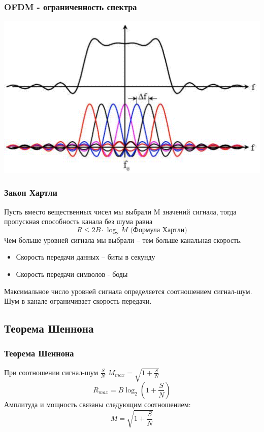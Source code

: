 \documentclass[utf8]{beamer}
\begin{document}
\begin{frame}
\frametitle{OFDM - ограниченность спектра}
\begin{center}
\includegraphics[width=\textwidth]{pic/ofdm-spectrum.pdf}
\end{center}
\end{frame}
\begin{frame}
\frametitle{Закон Хартли}
Пусть вместо вещественных чисел мы выбрали M значений сигнала, тогда пропускная способность канала без шума равна
$$
R\leq 2B\cdot \log_2 M \textrm{ (Формула Хартли)}
$$
Чем больше уровней сигнала мы выбрали -- тем больше канальная скорость.
\begin{itemize}
	\item Скорость передачи данных -- биты в секунду
	\item Скорость передачи символов - боды
\end{itemize}
Максимальное число уровней сигнала определяется соотношением сигнал-шум. Шум в канале ограничивает скорость передачи.
\end{frame}
\subsection{Теорема Шеннона}
\begin{frame}
\frametitle{Теорема Шеннона}
При соотношении сигнал-шум $\frac{S}{N}$ $M_{max} = \sqrt{1 + \frac{S}{N}}$
$$
R_{max} = B \log_2 (1+\frac{S}{N})
$$
Амплитуда и мощность связаны следующим соотношением:
$$
M = \sqrt{1 + \frac{S}{N}}
$$
\end{frame}
\end{document}
